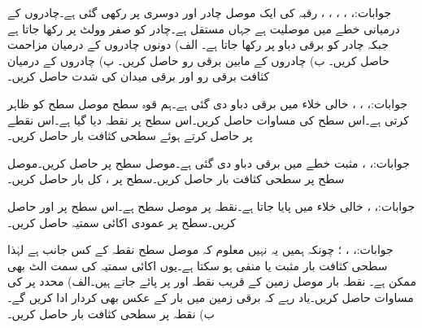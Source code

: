 جوابات:، ، ، ، ، 
رقبہ  کی ایک موصل چادر  اور دوسری  پر رکھی گئی ہے۔چادروں کے درمیانی خطے میں موصلیت  ہے جہاں  مستقل ہے۔چادر  کو صفر وولٹ پر رکھا جاتا ہے جبکہ چادر  کو  برقی دباو پر رکھا جاتا ہے۔ الف) دونوں چادروں کے درمیان مزاحمت حاصل کریں۔ ب) چادروں کے مابین برقی رو حاصل کریں۔ پ) چادروں کے درمیان کثافت برقی رو اور برقی میدان کی شدت حاصل کریں۔

جوابات:، ، ،
خالی خلاء میں برقی دباو  دی گئی ہے۔ہم قوہ سطح  موصل سطح کو ظاہر کرتی ہے۔اس سطح کی مساوات حاصل کریں۔اس سطح پر نقطہ  دیا گیا ہے۔اس نقطے پر  حاصل کرتے ہوئے سطحی کثافت بار  حاصل کریں۔

جوابات:، ،
مثبت  خطے میں برقی دباو  دی گئی ہے۔موصل سطح  پر   حاصل کریں۔موصل سطح پر سطحی کثافت بار حاصل کریں۔سطح پر ،  کل بار حاصل کریں۔

جوابات:، ، 
خالی خلاء میں  پایا جاتا ہے۔نقطہ  پر موصل سطح ہے۔اس سطح پر  اور  حاصل کریں۔سطح پر عمودی اکائی سمتیہ  حاصل کریں۔

جوابات:، ،
 ؛ چونکہ ہمیں یہ نہیں معلوم کہ موصل سطح نقطہ   کے کس جانب ہے لہٰذا سطحی کثافت بار مثبت یا منفی ہو سکتا ہے۔یوں اکائی سمتیہ کی سمت الٹ بھی ممکن ہے۔
نقطہ بار  موصل زمین  کے قریب نقطہ  اور  پر پائے جاتے ہیں۔الف) محدد  پر  کی مساوات حاصل کریں۔یاد رہے کہ برقی زمین میں بار کے عکس بھی کردار ادا کریں گے۔ ب) نقطہ  پر سطحی کثافت بار حاصل کریں۔

